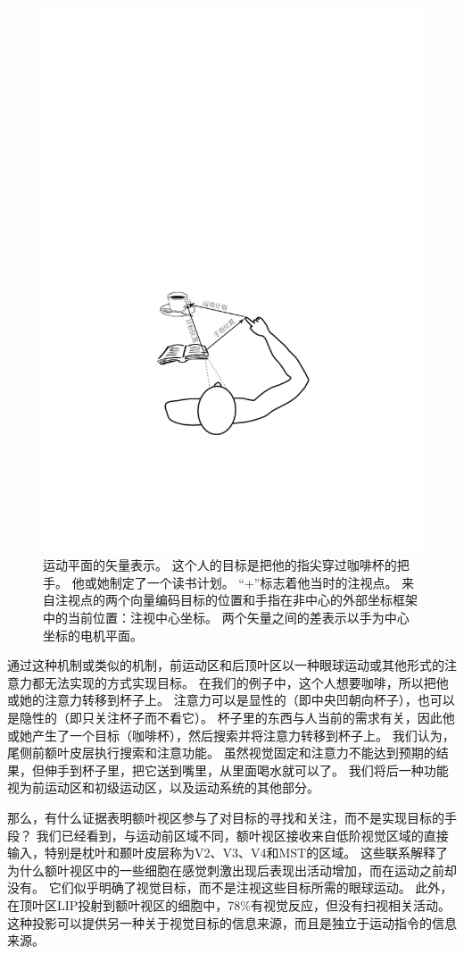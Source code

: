 \begin{figure}
	\centering
	\includegraphics[width=0.55\linewidth]{chap5/Fig_5_3}
	\caption{运动平面的矢量表示。
		这个人的目标是把他的指尖穿过咖啡杯的把手。
		他或她制定了一个读书计划。
		“+”标志着他当时的注视点。
		来自注视点的两个向量编码目标的位置和手指在非中心的外部坐标框架中的当前位置：注视中心坐标。
		两个矢量之间的差表示以手为中心坐标的电机平面\cite{shadmehr2004computational}。}
	\label{fig:5_3}
\end{figure}


通过这种机制或类似的机制，前运动区和后顶叶区以一种眼球运动或其他形式的注意力都无法实现的方式实现目标。
在我们的例子中，这个人想要咖啡，所以把他或她的注意力转移到杯子上。
注意力可以是显性的（即中央凹朝向杯子），也可以是隐性的（即只关注杯子而不看它）。
杯子里的东西与人当前的需求有关，因此他或她产生了一个目标（咖啡杯），然后搜索并将注意力转移到杯子上。
我们认为，尾侧前额叶皮层执行搜索和注意功能。
虽然视觉固定和注意力不能达到预期的结果，但伸手到杯子里，把它送到嘴里，从里面喝水就可以了。
我们将后一种功能视为前运动区和初级运动区，以及运动系统的其他部分。


那么，有什么证据表明额叶视区参与了对目标的寻找和关注，而不是实现目标的手段？
我们已经看到，与运动前区域不同，额叶视区接收来自低阶视觉区域的直接输入，特别是枕叶和颞叶皮层称为V2、V3、V4和MST的区域\cite{stanton1995topography}。
这些联系解释了为什么额叶视区中的一些细胞在感觉刺激出现后表现出活动增加，而在运动之前却没有\cite{schall1991neuronal}。
它们似乎明确了视觉目标，而不是注视这些目标所需的眼球运动。
此外，在顶叶区LIP投射到额叶视区的细胞中，78\%有视觉反应，但没有扫视相关活动\cite{ferraina2002comparison}。
这种投影可以提供另一种关于视觉目标的信息来源，而且是独立于运动指令的信息来源。


